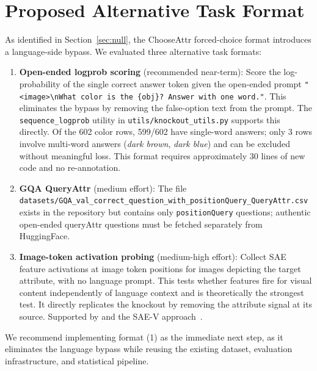 \documentclass[11pt,a4paper]{article}
\begin{document}
\section{Proposed Alternative Task Format}
\label{sec:task}

As identified in Section~\ref{sec:null}, the ChooseAttr forced-choice format introduces a
language-side bypass.
We evaluated three alternative task formats:

\begin{enumerate}
  \item \textbf{Open-ended logprob scoring} (recommended near-term):
    Score the log-probability of the single correct answer token given the open-ended prompt
    \texttt{"<image>\textbackslash nWhat color is the \{obj\}? Answer with one word."}.
    This eliminates the bypass by removing the false-option text from the prompt.
    The \texttt{sequence\_logprob} utility in \texttt{utils/knockout\_utils.py} supports this
    directly. Of the 602 color rows, 599/602 have single-word answers; only 3 rows involve
    multi-word answers (\emph{dark brown}, \emph{dark blue}) and can be excluded without
    meaningful loss.
    This format requires approximately 30 lines of new code and no re-annotation.

  \item \textbf{GQA QueryAttr} (medium effort):
    The file \texttt{datasets/GQA\_val\_correct\_question\_with\_positionQuery\_QueryAttr.csv}
    exists in the repository but contains only \texttt{positionQuery} questions; authentic
    open-ended queryAttr questions must be fetched separately from HuggingFace.

  \item \textbf{Image-token activation probing} (medium-high effort):
    Collect SAE feature activations at image token positions for images depicting the target
    attribute, with no language prompt. This tests whether features fire for visual content
    independently of language context and is theoretically the strongest test.
    It directly replicates the knockout by removing the attribute signal at its source.
    Supported by \citet{tong2024iclr} and the SAE-V approach~\citep{saev2025}.
\end{enumerate}

\noindent We recommend implementing format (1) as the immediate next step, as it eliminates the
language bypass while reusing the existing dataset, evaluation infrastructure, and statistical
pipeline.
\end{document}

